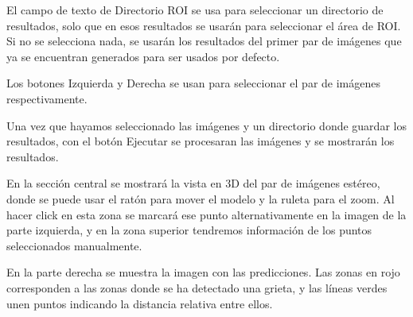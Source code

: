 El campo de texto de Directorio ROI se usa para seleccionar un directorio de resultados, solo que en esos resultados se usarán para seleccionar el área de ROI. Si no se selecciona nada, se usarán los resultados del primer par de imágenes que ya se encuentran generados para ser usados por defecto.

Los botones Izquierda y Derecha se usan para seleccionar el par de imágenes respectivamente.

Una vez que hayamos seleccionado las imágenes y un directorio donde guardar los resultados, con el botón Ejecutar se procesaran las imágenes y se mostrarán los resultados.


En la sección central se mostrará la vista en 3D del par de imágenes estéreo, donde se puede usar el ratón para mover el modelo y la ruleta para el zoom. Al hacer click en esta zona se marcará ese punto alternativamente en la imagen de la parte izquierda, y en la zona superior tendremos información de los puntos seleccionados manualmente.

En la parte derecha se muestra la imagen con las predicciones. Las zonas en rojo corresponden a las zonas donde se ha detectado una grieta, y las líneas verdes unen puntos indicando la distancia relativa entre ellos.
